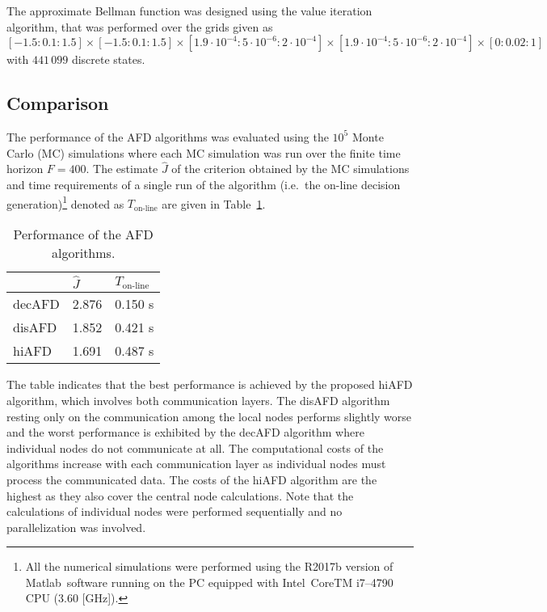 \documentclass[conference,10pt]{IEEEtran}
\begin{document}
The approximate Bellman function was designed using the value iteration algorithm, that was performed over the grids given as
$[-1.5:0.1:1.5]\times[-1.5:0.1:1.5]\times[1.9\cdot10^{-4}:5\cdot10^{-6}:2\cdot10^{-4}]\times[1.9\cdot10^{-4}:5\cdot10^{-6}:2\cdot10^{-4}]\times[0:0.02:1]$
with $441\,099$ discrete states. 
\subsection{Comparison}\label{sec:comparison}
The performance of the AFD algorithms was evaluated using the $10^5$ Monte Carlo (MC) simulations where each MC simulation was run over the finite time horizon $F=400$. 
The  estimate $\hat{J}$ of the criterion obtained by the MC simulations and time requirements  of a single run of the algorithm (i.e.~the on-line
decision generation)\footnote{All the numerical simulations were performed using the R2017b version of Matlab\textregistered\ software running on the PC
equipped with Intel\textregistered\ CoreTM i7--4790 CPU (3.60 [GHz]).} denoted as $T_{\text{on-line}}$ are given in Table~\ref{tab:performance}.
\begin{table}[ht]
\renewcommand{\arraystretch}{1.2}
  \begin{center}
    \caption{Performance of the AFD algorithms.}\label{tab:performance}
    \begin{tabular}{lll}\toprule
      &$\hat{J}$& $T_{\text{on-line}}$\\\midrule
      decAFD     & 2.876 &0.150 \si{\second}\\
      disAFD     & 1.852 &0.421 \si{\second}\\
      hiAFD      & 1.691 &0.487 \si{\second}\\\bottomrule
\end{tabular} 
\end{center}
\end{table}

The table indicates that the best performance is achieved by the proposed hiAFD algorithm, which involves both communication layers.
The disAFD algorithm resting only on the communication among the local nodes performs slightly worse and the worst performance is exhibited by the decAFD algorithm where individual nodes do not communicate at all. 
The computational costs of the algorithms increase with each communication layer as individual nodes must process the communicated data.
The costs of the hiAFD algorithm are the highest as they also cover the central node calculations.
Note that the calculations of individual nodes were performed sequentially and no parallelization was involved. 
\end{document}

